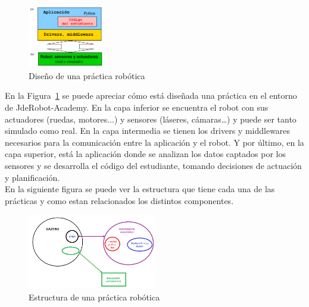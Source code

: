 \begin{figure}[H]
  \begin{center}
    \includegraphics[width=0.3\textwidth]{figures/Introduccion/esquema.png}
		\caption{Diseño de una práctica robótica}
		\label{fig.esquema}
		\end{center}
\end{figure}

En la Figura~\ref{fig.esquema} se puede apreciar cómo está diseñada una práctica en el entorno de JdeRobot-Academy. En la capa inferior se encuentra el robot con sus actuadores (ruedas, motores...) y sensores (láseres, cámaras…) y puede ser tanto simulado como real.  En la capa intermedia se tienen los drivers y middlewares necesarios para la comunicación entre la aplicación y el robot. Y por último, en la capa superior, está la aplicación donde se analizan los datos captados por los sensores y se desarrolla el código del estudiante, tomando decisiones de actuación y planificación. \\

En la siguiente figura se puede ver la estructura que tiene cada una de las prácticas y como estan relacionados los distintos componentes.

\begin{figure}[H]
  \begin{center}
    \includegraphics[width=0.5\textwidth]{figures/Introduccion/estructura.png}
		\caption{Estructura de una práctica robótica}
		\label{fig.estructura}
		\end{center}
\end{figure}


